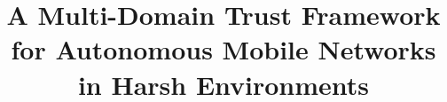 \documentclass{aamas2016}
\begin{document}


\title{A Multi-Domain Trust Framework for Autonomous Mobile Networks in Harsh Environments}




%
%
%
%

%

\end{document}

